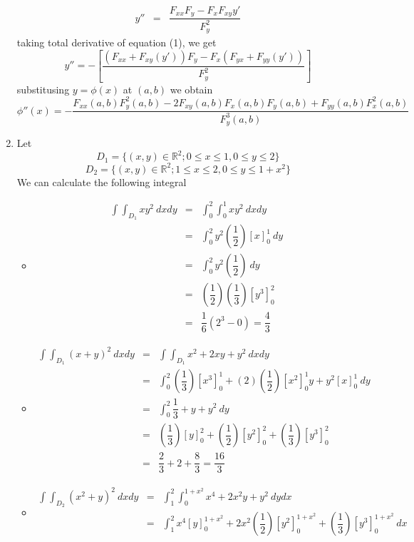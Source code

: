 \documentclass[a4paper,10pt]{article}
\newcommand{\R}{\mathbb{R}}
\begin{document}
\begin{enumerate}
	\begin{eqnarray}\nonumber
	y'' &=& \dfrac{F_{xx}F_{y}-F_{x}F_{xy}y'}{F_{y}^2}
	\end{eqnarray}
	taking total derivative of equation (1), we get
	\[ y'' = -[\dfrac{(F_{xx}+F_{xy}(y'))F_{y}-F_{x}(F_{yx}+F_{yy}(y'))}{F_{y}^2}] \]
	substitusing $ y=\phi(x) $ at $ (a,b) $ we obtain
	\[ \phi ''(x) = - \dfrac{F_{xx}(a,b)F_{y}^2(a,b)-2F_{xy}(a,b)F_{x}(a,b)F_{y}(a,b)+F_{yy}(a,b)F_{x}^2(a,b)}{F_{y}^3(a,b)}\]
	\item Let
	\[ D_{1} = \{ (x,y)\in\R^2 ; 0 \leq x\leq 1, 0 \leq y \leq2 \} \]
	\[ D_{2} = \{ (x,y) \in \R^2 ; 1 \leq x \leq 2, 0 \leq y \leq1+x^2 \} \]
	We can calculate the following integral
	\begin{itemize}
		\item \begin{eqnarray}\nonumber
		\int\int_{D_{1}} xy^2 \ dxdy &=& \int_{0}^{2} \int_{0}^{1} xy^2 \ dxdy \\ \nonumber
		&=& \int_{0}^{2} y^2 (\dfrac{1}{2}) [ x ]_{0}^{1} \ dy \\ \nonumber
		&=& \int_{0}^{2} y^2( \dfrac{1}{2}) \ dy\\ \nonumber
		&=& (\dfrac{1}{2}) (\dfrac{1}{3}) [y^3]_{0}^{2} \\ \nonumber
		&=& \dfrac{1}{6}(2^3-0) = \dfrac{4}{3} 
		\end{eqnarray}
		\item \begin{eqnarray}\nonumber
		\int\int_{D_{1}} (x+y)^2 \ dxdy &=& \int\int_{D_{1}} x^2 + 2xy +y^2 \ dx dy \\ \nonumber
		&=& \int_{0}^{2} (\dfrac{1}{3}) [x^3]_{0}^{1} + (2)(\dfrac{1}{2}) [x^2]_{0}^{1} y + y^2[x]_{0}^{1} \ dy \\ \nonumber
		&=& \int_{0}^{2} \dfrac{1}{3} + y + y^2 \ dy \\ \nonumber
		&=& (\dfrac{1}{3}) [y]_{0}^{2} + (\dfrac{1}{2}) [y^2]_{0}^{2} + (\dfrac{1}{3}) [y^3]_{0}^{2} \\ \nonumber
		&=& \dfrac{2}{3} + 2 + \dfrac{8}{3} = \dfrac{16}{3}
		\end{eqnarray}
		\item \begin{eqnarray} \nonumber
		\int\int_{D_{2}} (x^2 +y)^2 \ dx dy &=&  \int_{1}^{2}\int_{0}^{1+x^2} x^4 +2x^2y+y^2 \ dy dx  \\ \nonumber	
		&=&  \int_{1}^{2} x^4 [y]_{0}^{1+x^2} + 2x^2(\dfrac{1}{2})[y^2]_{0}^{1+x^2} + (\dfrac{1}{3}) [y^3]_{0}^{1+x^2} \ dx \\ \nonumber

\end{eqnarray}
\end{itemize}
\end{enumerate}
\end{document}
